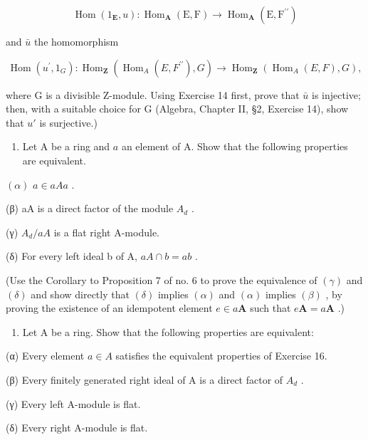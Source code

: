 \[
\operatorname{Hom} \left(1 _ {\mathbf {E}}, u\right): \operatorname{Hom} _ {\mathbf {A}} (\mathrm{E}, \mathrm{F}) \rightarrow \operatorname{Hom} _ {\mathbf {A}} (\mathrm{E}, \mathrm{F} ^ {\prime \prime})
\]

and \(\bar{u}\) the homomorphism

\[
\operatorname{Hom} \left(u ^ {\prime}, 1 _ {G}\right): \operatorname{Hom} _ {\mathbf {Z}} \left(\operatorname{Hom} _ {A} (E, F ^ {\prime \prime}), G\right)\rightarrow \operatorname{Hom} _ {\mathbf {Z}} \left(\operatorname{Hom} _ {A} (E, F), G\right),
\]

where G is a divisible Z-module. Using Exercise 14 first, prove that \(\bar{u}\) is injective; then, with a suitable choice for G (Algebra, Chapter II, §2, Exercise 14), show that \(u'\) is surjective.)

\begin{enumerate}
\def\labelenumi{\arabic{enumi}.}
\setcounter{enumi}{15}
\tightlist
\item
  Let A be a ring and \(a\) an element of A. Show that the following properties are equivalent.
\end{enumerate}

\((\alpha)\) \(a \in aAa\) .

(β) aA is a direct factor of the module \(A_{d}\) .

(γ) \(A_{d}/aA\) is a flat right A-module.

(δ) For every left ideal b of A, \(aA \cap b = ab\) .

(Use the Corollary to Proposition 7 of no. 6 to prove the equivalence of \((\gamma)\) and \((\delta)\) and show directly that \((\delta)\) implies \((\alpha)\) and \((\alpha)\) implies \((\beta)\) , by proving the existence of an idempotent element \(e \in a\mathbf{A}\) such that \(e\mathbf{A} = a\mathbf{A}\) .)

\begin{enumerate}
\def\labelenumi{\arabic{enumi}.}
\setcounter{enumi}{16}
\tightlist
\item
  Let A be a ring. Show that the following properties are equivalent:
\end{enumerate}

(α) Every element \(a \in A\) satisfies the equivalent properties of Exercise 16.

(β) Every finitely generated right ideal of A is a direct factor of \(A_{d}\) .

(γ) Every left A-module is flat.

(δ) Every right A-module is flat.

